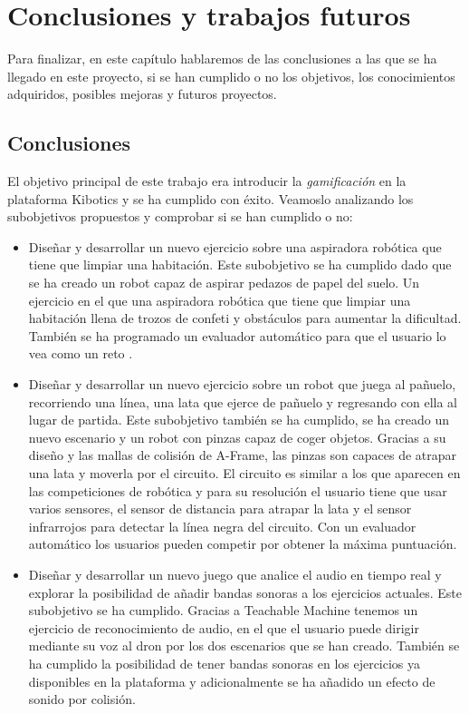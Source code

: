 \chapter{Conclusiones y trabajos futuros}\label{conclusion}
Para finalizar, en este capítulo hablaremos de las conclusiones a las que se ha llegado en este proyecto, si se han cumplido o no los objetivos,  los conocimientos adquiridos, posibles mejoras y futuros proyectos.

\section{Conclusiones}

El objetivo principal de este trabajo era introducir la \textit{gamificación} en la plataforma Kibotics y se ha cumplido con éxito. Veamoslo analizando los subobjetivos propuestos y comprobar si se han cumplido o no:

\begin{itemize}
    \item Diseñar y desarrollar un nuevo ejercicio sobre una aspiradora robótica que tiene que limpiar una habitación.  Este subobjetivo se ha cumplido dado que se ha creado un robot capaz de aspirar pedazos de papel del suelo. Un ejercicio en el que una aspiradora robótica que tiene que limpiar una habitación llena de trozos de confeti y obstáculos para aumentar la dificultad. También se ha programado un evaluador automático para que el usuario lo vea como un reto .

    \item Diseñar y desarrollar un nuevo ejercicio sobre un robot que juega al pañuelo, recorriendo una línea, una lata que ejerce de pañuelo y regresando con ella al lugar de partida. Este subobjetivo también se ha cumplido, se ha creado un nuevo escenario y un robot con pinzas capaz de coger objetos. Gracias a su diseño y las mallas de colisión de A-Frame, las pinzas son capaces de atrapar una lata y moverla por el circuito. El circuito es similar a los que aparecen en las competiciones de robótica y para su resolución el usuario tiene que usar varios sensores, el sensor de distancia para atrapar la lata y el sensor infrarrojos para detectar la línea negra del circuito. Con un evaluador automático los usuarios pueden competir por obtener la máxima puntuación. 
    
        \item Diseñar y desarrollar un nuevo juego que analice el audio en tiempo real y explorar la posibilidad de añadir bandas sonoras a los ejercicios actuales.  Este subobjetivo se ha cumplido. Gracias a Teachable Machine tenemos un ejercicio de reconocimiento de audio, en el que el usuario puede dirigir mediante su voz al dron por los dos escenarios que se han creado. También se ha cumplido la posibilidad de tener bandas sonoras en los ejercicios ya disponibles en la plataforma y adicionalmente se ha añadido un efecto de sonido por colisión. 

\end{itemize}

